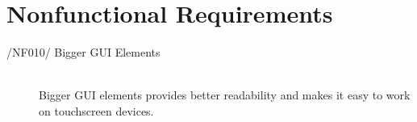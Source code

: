 \section{Nonfunctional Requirements}

\begin{description}
\item[/NF010/ Bigger GUI Elements]\hfill \\ Bigger GUI elements provides better readability and makes it easy to work on touchscreen devices.
\end{description}
